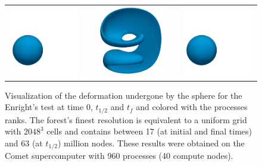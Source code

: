 \begin{figure}[htbp]
\begin{center}
\begin{tabular}{ccccc}
\includegraphics[width=.28\textwidth]{figures/enright_blue_0.png}
&
\hspace{.1cm}
&
\includegraphics[width=.28\textwidth]{figures/enright_blue_1.png}
&
\hspace{.1cm}
&
\includegraphics[width=.28\textwidth]{figures/enright_blue_2.png}
\end{tabular}
\caption{Visualization of the deformation undergone by the sphere for the Enright's test at time 0, $t_{1/2}$ and $t_f$ and colored with the processes ranks. The forest's finest resolution is equivalent to a uniform grid with $2048^3$ cells and contains between 17 (at initial and final times) and 63 (at $t_{1/2}$) million nodes. These results were obtained on the Comet supercomputer with 960 processes (40 compute nodes).} \label{fig:accuracy}
\end{center}
\end{figure}